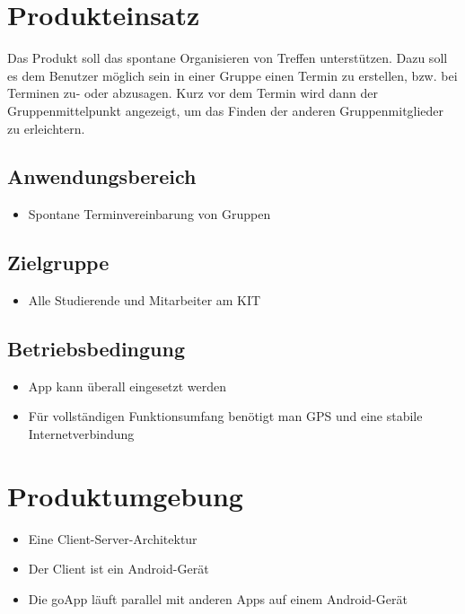 \documentclass{scrartcl}
\begin{document}
	\section{Produkteinsatz}      
		Das Produkt soll das spontane Organisieren von Treffen unterstützen. Dazu soll es dem Benutzer möglich sein in einer Gruppe einen Termin zu erstellen, bzw. bei Terminen zu- oder abzusagen. \newline
		Kurz vor dem Termin wird dann der Gruppenmittelpunkt angezeigt, um das Finden der anderen Gruppenmitglieder zu erleichtern.

	\subsection{Anwendungsbereich}
	\begin{itemize}	        
		\item Spontane Terminvereinbarung von Gruppen
	\end{itemize}
	\subsection{Zielgruppe}
	\begin{itemize}	        
		\item Alle Studierende und Mitarbeiter am KIT
	\end{itemize}
	\subsection{Betriebsbedingung}
	\begin{itemize}	        
		\item App kann überall eingesetzt werden
		\item Für vollständigen Funktionsumfang benötigt man GPS und eine stabile Internetverbindung
	\end{itemize}
	
	\newpage
	
	
	\section{Produktumgebung}
	\begin{itemize}	        
		\item Eine \gls{Client-Server-Architektur}
		\item Der \gls{Client} ist ein Android-Gerät
		\item Die goApp läuft parallel mit anderen Apps auf einem Android-Gerät
	\end{itemize}
\end{document}
